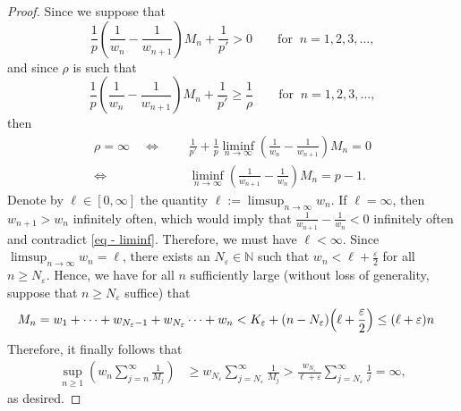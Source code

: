 \documentclass[10pt,a4paper]{amsart}
\begin{document}
\begin{proof}
    Since we suppose that 
    \[
    \frac{1}{p}\left(\frac{1}{w_n}-\frac{1}{w_{n+1}}\right)\!M_n+\frac{1}{p'} > 0 \qquad \text{for }~ n=1,2,3,\dots,
    \]
    and since $\rho$ is such that 
    \[
    \frac{1}{p}\left(\frac{1}{w_n}-\frac{1}{w_{n+1}}\right)\!M_n+\frac{1}{p'} \geq \frac{1}{\rho} \qquad \text{for }~ n=1,2,3,\dots,
    \]
    then 
    \begin{align}\label{eq - liminf}
        \rho=\infty \quad\iff\quad  \,\,&\frac{1}{p'} + \frac{1}{p} \liminf_{n\to\infty} \left(\frac{1}{w_n}-\frac{1}{w_{n+1}}\right)\!M_n =0 \nonumber\\
        \iff\quad  \,\,&\liminf_{n\to\infty} \left(\frac{1}{w_{n+1}}-\frac{1}{w_n}\right)\!M_n = p-1.
    \end{align} 
    Denote by $\ell\in [0,\infty]$ the quantity $\ell:= \limsup_{n\to\infty}w_{n}$. If $\ell=\infty$, then $w_{n+1} > w_n$ infinitely often, which would imply that $\frac{1}{w_{n+1}}-\frac{1}{w_n} < 0$ infinitely often and contradict \eqref{eq - liminf}. Therefore, we must have $\ell<\infty$. 
    Since $\limsup_{n\to\infty} w_n = \ell$, there exists an $N_\varepsilon\in \mathbb{N}$ such that $w_n < \ell+\frac{\varepsilon}{2}$ for all $n\geq N_\varepsilon$. Hence, we have for all $n$ sufficiently large (without loss of generality, suppose that $n\geq N_\varepsilon$ suffice) that 
    \begin{align*}
        M_n &= w_1+\cdots +w_{N_\varepsilon-1} + w_{N_\varepsilon}  \cdots + w_n <  K_\varepsilon + (n-N_\varepsilon) \Bigl(\ell+\frac{\varepsilon}{2}\Bigr) \leq (\ell+\varepsilon) n
    \end{align*}
    Therefore, it finally follows that
    \begin{align*}
        \sup_{n\geq 1} \left( w_n \sum_{j=n}^{\infty} \frac{1}{M_j} \right) &\geq w_{N_\varepsilon} \sum_{j=N_\varepsilon}^{\infty} \frac{1}{M_j} > \frac{w_{N_\varepsilon}}{\ell+\varepsilon}  \sum_{j=N_\varepsilon}^{\infty} \frac{1}{j} = \infty,
    \end{align*} 
    as desired.
\end{proof}
\end{document}
